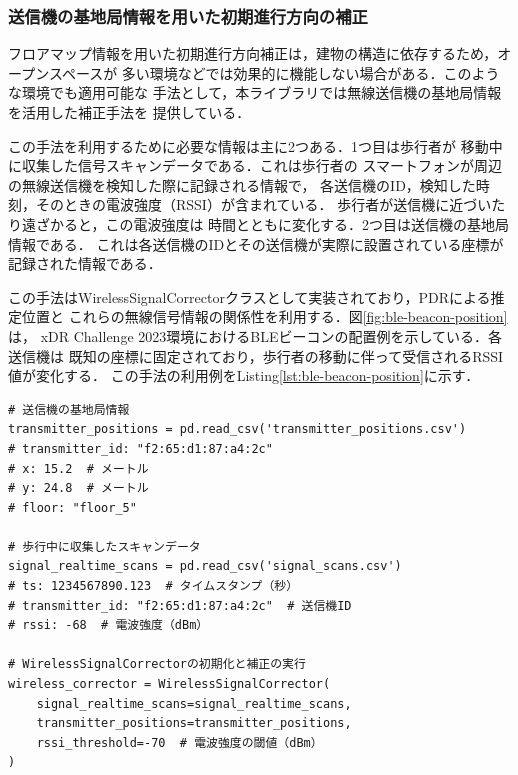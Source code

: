 
\subsubsection{送信機の基地局情報を用いた初期進行方向の補正}

フロアマップ情報を用いた初期進行方向補正は，建物の構造に依存するため，オープンスペースが
多い環境などでは効果的に機能しない場合がある．このような環境でも適用可能な
手法として，本ライブラリでは無線送信機の基地局情報を活用した補正手法を
提供している．

この手法を利用するために必要な情報は主に2つある．1つ目は歩行者が
移動中に収集した信号スキャンデータである．これは歩行者の
スマートフォンが周辺の無線送信機を検知した際に記録される情報で，
各送信機のID，検知した時刻，そのときの電波強度（RSSI）が含まれている．
歩行者が送信機に近づいたり遠ざかると，この電波強度は
時間とともに変化する．2つ目は送信機の基地局情報である．
これは各送信機のIDとその送信機が実際に設置されている座標が
記録された情報である．

この手法はWirelessSignalCorrectorクラスとして実装されており，PDRによる推定位置と
これらの無線信号情報の関係性を利用する．図\ref{fig:ble-beacon-position}は，
xDR Challenge 2023環境におけるBLEビーコンの配置例を示している．各送信機は
既知の座標に固定されており，歩行者の移動に伴って受信されるRSSI値が変化する．
この手法の利用例をListing\ref{lst:ble-beacon-position}に示す．

\begin{lstlisting}[caption={WirelessSignalCorrectorの使用例},label=lst:ble-beacon-position,float=h]
# 送信機の基地局情報
transmitter_positions = pd.read_csv('transmitter_positions.csv')
# transmitter_id: "f2:65:d1:87:a4:2c"
# x: 15.2  # メートル
# y: 24.8  # メートル
# floor: "floor_5"

# 歩行中に収集したスキャンデータ
signal_realtime_scans = pd.read_csv('signal_scans.csv')
# ts: 1234567890.123  # タイムスタンプ（秒）
# transmitter_id: "f2:65:d1:87:a4:2c"  # 送信機ID
# rssi: -68  # 電波強度（dBm）

# WirelessSignalCorrectorの初期化と補正の実行
wireless_corrector = WirelessSignalCorrector(
    signal_realtime_scans=signal_realtime_scans,
    transmitter_positions=transmitter_positions,
    rssi_threshold=-70  # 電波強度の閾値（dBm）
)
\end{lstlisting}

